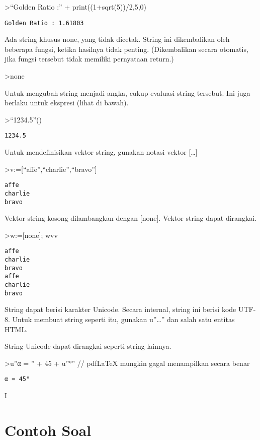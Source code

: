 \documentclass[
]{book}
\begin{document}
\textgreater{}``Golden Ratio :'' + print((1+sqrt(5))/2,5,0)

\begin{verbatim}
Golden Ratio : 1.61803
\end{verbatim}

Ada string khusus none, yang tidak dicetak. String ini dikembalikan oleh beberapa fungsi, ketika hasilnya tidak penting. (Dikembalikan secara otomatis, jika fungsi tersebut tidak memiliki pernyataan return.)

\textgreater none

Untuk mengubah string menjadi angka, cukup evaluasi string tersebut. Ini juga berlaku untuk ekspresi (lihat di bawah).

\textgreater{}``1234.5''()

\begin{verbatim}
1234.5
\end{verbatim}

Untuk mendefinisikan vektor string, gunakan notasi vektor {[}\ldots{]}

\textgreater v:={[}``affe'',``charlie'',``bravo''{]}

\begin{verbatim}
affe
charlie
bravo
\end{verbatim}

Vektor string kosong dilambangkan dengan {[}none{]}. Vektor string dapat dirangkai.

\textgreater w:={[}none{]}; w\textbar v\textbar v

\begin{verbatim}
affe
charlie
bravo
affe
charlie
bravo
\end{verbatim}

String dapat berisi karakter Unicode. Secara internal, string ini berisi kode UTF-8. Untuk membuat string seperti itu, gunakan u''\ldots'' dan salah satu entitas HTML.

String Unicode dapat dirangkai seperti string lainnya.

\textgreater u''α = '' + 45 + u''°'' // pdfLaTeX mungkin gagal menampilkan secara benar

\begin{verbatim}
α = 45°
\end{verbatim}

I

\section{Contoh Soal}\label{contoh-soal}
\end{document}
